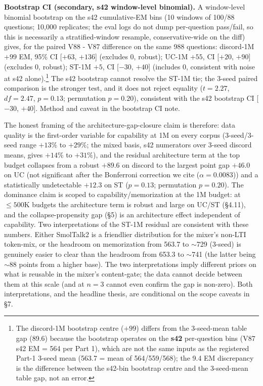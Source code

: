 \documentclass[11pt]{article}
\begin{document}
\textbf{Bootstrap CI (secondary, s42 window-level binomial).} A window-level binomial bootstrap on the s42 cumulative-EM bins (10 windows of 100/88 questions; 10,000 replicates; the eval logs do not dump per-question pass/fail, so this is necessarily a stratified-window resample, conservative-wide on the diff) gives, for the paired V88 - V87 difference on the same 988 questions: discord-1M $+99$ EM, 95\% CI [$+63$, $+136$] (excludes 0, robust); UC-1M $+55$, CI [$+20$, $+90$] (excludes 0, robust); ST-1M $+5$, CI [$-30$, $+40$] (includes 0, consistent with noise at s42 alone).\footnote{The discord-1M bootstrap centre ($+99$) differs from the 3-seed-mean table gap (89.6) because the bootstrap operates on the \textbf{s42} per-question bins (V87 s42 EM = 564 per Part 1), which are not the same inputs as the registered Part-1 3-seed mean (563.7 = mean of 564/559/568); the 9.4 EM discrepancy is the difference between the s42-bin bootstrap centre and the 3-seed-mean table gap, not an error.} The s42 bootstrap cannot resolve the ST-1M tie; the 3-seed paired comparison is the stronger test, and it does not reject equality ($t = 2.27$, $df = 2.47$, $p = 0.13$; permutation $p = 0.20$), consistent with the s42 bootstrap CI [$-30$, $+40$]. Method and caveat in the bootstrap CI note.

The honest framing of the architecture-gap-closure claim is therefore: data quality is the first-order variable for capability at 1M on every corpus (3-seed/3-seed range $+13\%$ to $+29\%$; the mixed basis, s42 numerators over 3-seed discord means, gives $+14\%$ to $+31\%$), and the residual architecture term at the top budget collapses from a robust $+89.6$ on discord to the largest point gap $+46.0$ on UC (not significant after the Bonferroni correction we cite ($\alpha=0.0083$)) and a statistically undetectable $+12.3$ on ST ($p = 0.13$; permutation $p = 0.20$). The dominance claim is scoped to capability/memorization at the 1M budget: at $\leq 500$K budgets the architecture term is robust and large on UC/ST (\S4.11), and the collapse-propensity gap (\S5) is an architecture effect independent of capability. Two interpretations of the ST-1M residual are consistent with these numbers. Either SmolTalk2 is a friendlier distribution for the mixer's non-LTI token-mix, or the headroom on memorization from 563.7 to $\sim$729 (3-seed) is genuinely easier to clear than the headroom from 653.3 to $\sim$741 (the latter being $\sim$88 points from a higher base). The two interpretations imply different priors on what is reusable in the mixer's content-gate; the data cannot decide between them at this scale (and at $n = 3$ cannot even confirm the gap is non-zero). Both interpretations, and the headline thesis, are conditional on the scope caveats in \S7.
\end{document}

